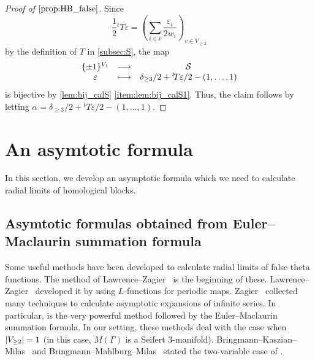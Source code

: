 \documentclass[11pt,a4paper,lualatex]{amsart}
\numberwithin{equation}{section} %
\begin{document}
\begin{proof}[Proof of $ \cref{prop:HB_false} $]
	Since 
	\[
	\frac{1}{2} {}^t\!T \varepsilon = \left( \sum_{i \in \overline{v}} \frac{\varepsilon_i}{2w_i} \right)_{v \in V_{\ge 2}}
	\]
	by the definition of $ T $ in \cref{subsec:S}, the map
	\[
	\begin{array}{ccc}
		\{ \pm 1 \}^{V_1} & \longrightarrow & \mathcal{S} \\
		\varepsilon & \longmapsto & \delta_{\ge 3}/2 + {}^t\!T \varepsilon/2 - (1, \dots, 1) 
	\end{array}
	\]
	is bijective by \cref{lem:bij_calS} \cref{item:lem:bij_calS1}.
	Thus, the claim follows by letting $ \alpha = \delta_{\ge 3}/2 + {}^t\!T \varepsilon/2 - (1, \dots, 1) $.
\end{proof}


\section{An asymtotic formula} \label{sec:asymp}


In this section, we develop an asymptotic formula which we need to calculate radial limits of homological blocks.


\subsection{Asymtotic formulas obtained from Euler--Maclaurin summation formula} \label{subsec:Euler--Maclaurin}


Some useful methods have been developed to calculate radial limits of false theta functions.
The method of Lawrence--Zagier~\cite[p. 98, Proposition]{LZ} is the beginning of these.
Lawrence--Zagier~\cite{LZ} developed it by using $ L $-functions for periodic maps.
Zagier~\cite{Zagier_asymptotic} collected many techniques to calculate asymptotic expansions of infinite series.
In particular, \cite[Equation (44)]{Zagier_asymptotic} is the very powerful method followed by the Euler--Maclaurin summation formula.
In our setting, these methods deal with the case when $ \left\lvert V_{\ge 2}\right\rvert = 1 $ (in this case, $ M(\Gamma) $ is a Seifert $ 3 $-manifold).
Bringmann--Kaszian--Milas~\cite[Equation (2.8)]{BKM} and Bringmann--Mahlburg--Milas~\cite[Lemma 2.2]{BMM_high_depth} stated the two-variable case of \cite[Equation (44)]{Zagier_asymptotic}.
\end{document}
